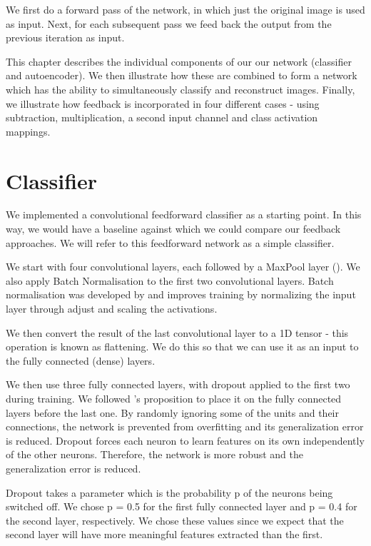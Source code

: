 \documentclass{l4proj}
\begin{document}
We first do a forward pass of the network, in which just the original image is used as input. Next, for each subsequent pass we feed back the output from the previous iteration as input.

This chapter describes the individual components of our our network (classifier and autoencoder). We then illustrate how these are combined to form a network which has the ability to simultaneously classify and reconstruct images. Finally, we illustrate how feedback is incorporated in four different cases - using subtraction, multiplication, a second input channel and class activation mappings.

\section{Classifier}
\label{app:classifier}
We implemented a convolutional feedforward classifier as a starting point. In this way, we would have a baseline against which we could compare our feedback approaches. We will refer to this feedforward network as a simple classifier.

We start with four convolutional layers, each followed by a MaxPool layer (\cite{maxpool}). 
We also apply Batch Normalisation to the first two convolutional layers. Batch normalisation was developed by \cite{batchnorm} and improves training by normalizing the input layer through adjust and scaling the activations.

We then convert the result of the last convolutional layer to a 1D tensor - this operation is known as flattening. We do this so that we can use it as an input to the fully connected (dense) layers.

We then use three fully connected layers, with dropout applied to the first two during training. We followed \cite{dropout}'s proposition to place it on the fully connected layers before the last one. By randomly ignoring some of the units and their connections, the network is prevented from overfitting and its generalization error is reduced. Dropout forces each neuron to learn features on its own independently of the other neurons.
Therefore, the network is more robust and the generalization error is reduced. 

Dropout takes a parameter which is the probability p of the neurons being switched off. We chose p = 0.5 for the first fully connected layer and p = 0.4 for the second layer, respectively. We chose these values since we expect that the second layer will have more meaningful features extracted than the first.
\end{document}
